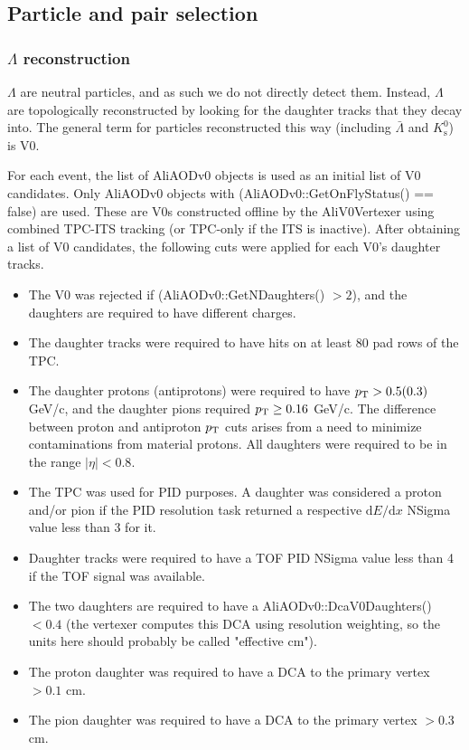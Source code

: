 \subsection{Particle and pair selection}
\label{sec:ParticlePairSelection}


\subsubsection{\texorpdfstring{$\Lambda$}{Lambda} reconstruction}
\label{sec:Recon}

$\Lambda$ are neutral particles, and as such we do not directly detect them.  
Instead, $\Lambda$ are topologically reconstructed by looking for the daughter tracks that they decay into.  
The general term for particles reconstructed this way (including $\bar{\Lambda}$ and $K^0_\mathrm{s}$) is V0.

For each event, the list of AliAODv0 objects is used as an initial list of V0 candidates.  
Only AliAODv0 objects with (AliAODv0::GetOnFlyStatus() == false) are used.  
These are V0s constructed offline by the AliV0Vertexer using combined TPC-ITS tracking (or TPC-only if the ITS is inactive).  
After obtaining a list of V0 candidates, the following cuts were applied for each V0's daughter tracks.

\begin{itemize}
\item The V0 was rejected if (AliAODv0::GetNDaughters() $> 2$), and the daughters are required to have different charges.
\item The daughter tracks were required to have hits on at least 80 pad rows of the TPC.
\item The daughter protons (antiprotons) were required to have $p_{\rm T} > 0.5 (0.3)$ GeV/c, and the daughter pions required $p_{\rm T} \geq 0.16$ GeV/c. 
The difference between proton and antiproton $p_{\rm T}$ cuts arises from a need to minimize contaminations from material protons. 
All daughters were required to be in the range $|\eta| < 0.8$.
\item The TPC was used for PID purposes.  
A daughter was considered a proton and/or pion if the PID resolution task returned a respective $\mathrm{d}E/\mathrm{d}x$ NSigma value less than 3 for it.
\item Daughter tracks were required to have a TOF PID NSigma value less than 4 if the TOF signal was available.
\item The two daughters are required to have a AliAODv0::DcaV0Daughters() $< 0.4$ (the vertexer computes this DCA using resolution weighting, so the units here should probably be called "effective cm").
\item The proton daughter was required to have a DCA to the primary vertex $> 0.1$ cm.
\item The pion daughter was required to have a DCA to the primary vertex $> 0.3$ cm.
\end{itemize}

